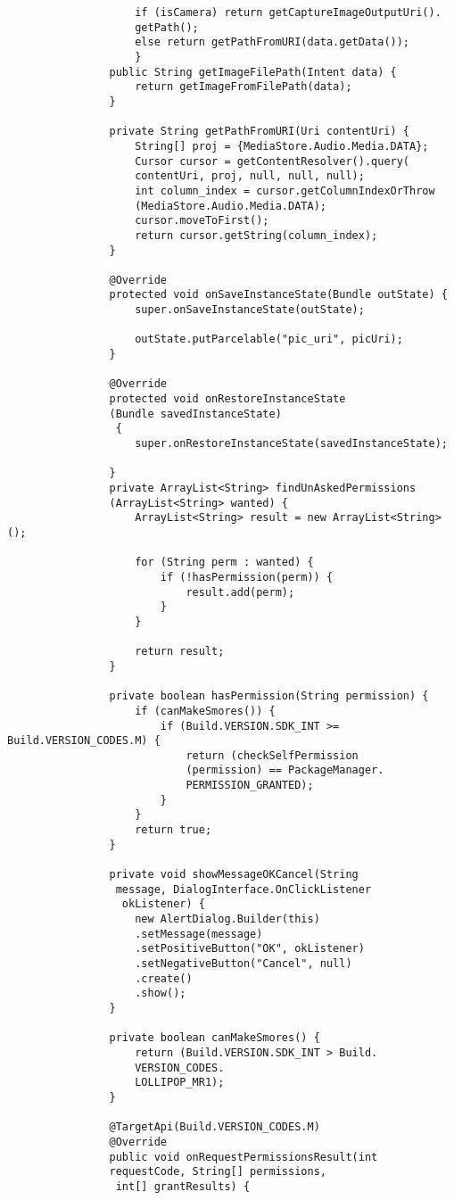 \documentclass[a4paper,12pt,toc=flat]{report}
\begin{document}
{{{{\begin{itemize}
\begin{verbatim}
 					if (isCamera) return getCaptureImageOutputUri().
 					getPath();
 					else return getPathFromURI(data.getData());
 					}
 				public String getImageFilePath(Intent data) {
 					return getImageFromFilePath(data);
 				}
 				
 				private String getPathFromURI(Uri contentUri) {
 					String[] proj = {MediaStore.Audio.Media.DATA};
 					Cursor cursor = getContentResolver().query(
 					contentUri, proj, null, null, null);
 					int column_index = cursor.getColumnIndexOrThrow
 					(MediaStore.Audio.Media.DATA);
 					cursor.moveToFirst();
 					return cursor.getString(column_index);
 				}
 				
 				@Override
 				protected void onSaveInstanceState(Bundle outState) {
 					super.onSaveInstanceState(outState);
 					
 					outState.putParcelable("pic_uri", picUri);
 				}
 				
 				@Override
 				protected void onRestoreInstanceState
 				(Bundle savedInstanceState)
 				 {
 					super.onRestoreInstanceState(savedInstanceState);
 
 				}
 				private ArrayList<String> findUnAskedPermissions
 				(ArrayList<String> wanted) {
 					ArrayList<String> result = new ArrayList<String>();
 					
 					for (String perm : wanted) {
 						if (!hasPermission(perm)) {
 							result.add(perm);
 						}
 					}
 					
 					return result;
 				}
 				
 				private boolean hasPermission(String permission) {
 					if (canMakeSmores()) {
 						if (Build.VERSION.SDK_INT >= Build.VERSION_CODES.M) {
 							return (checkSelfPermission
 							(permission) == PackageManager.
 							PERMISSION_GRANTED);
 						}
 					}
 					return true;
 				}
 				
 				private void showMessageOKCancel(String
 				 message, DialogInterface.OnClickListener
 				  okListener) {
 					new AlertDialog.Builder(this)
 					.setMessage(message)
 					.setPositiveButton("OK", okListener)
 					.setNegativeButton("Cancel", null)
 					.create()
 					.show();
 				}
 				
 				private boolean canMakeSmores() {
 					return (Build.VERSION.SDK_INT > Build.
 					VERSION_CODES.
 					LOLLIPOP_MR1);
 				}
 				
 				@TargetApi(Build.VERSION_CODES.M)
 				@Override
 				public void onRequestPermissionsResult(int 
 				requestCode, String[] permissions,
 				 int[] grantResults) {
 					

\end{verbatim}
\end{itemize}}}}}
\end{document}
